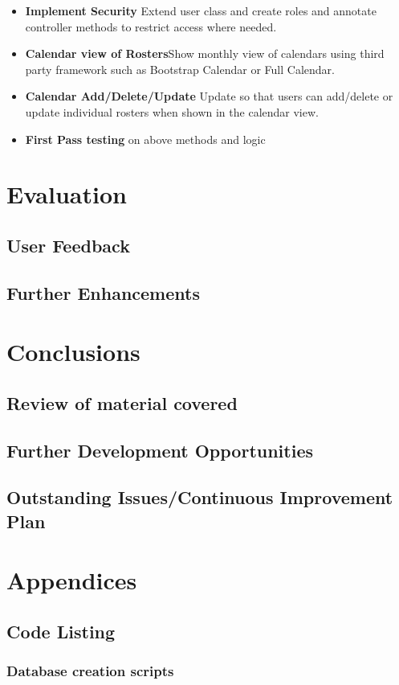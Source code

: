 \documentclass[a4paper,12pt]{article}
\begin{document}
\begin {itemize}
\item  \textbf{Implement Security} Extend user class and create roles and annotate controller methods to restrict access where needed.
\item  \textbf{Calendar view of Rosters}Show monthly view of calendars using third party framework such as Bootstrap Calendar or Full Calendar.
\item  \textbf{Calendar Add/Delete/Update }Update so that users can add/delete or update individual rosters when shown in the calendar view.
\item  \textbf{First Pass testing} on above methods and logic
\end {itemize}

\section {Evaluation}
\subsection {User Feedback}
\subsection {Further Enhancements}
\section {Conclusions}
\subsection {Review of material covered }
\subsection {Further Development Opportunities}
\subsection {Outstanding Issues/Continuous Improvement Plan}


\section {Appendices}
\subsection {Code Listing}

\subsubsection {Database creation scripts}
\end{document}
